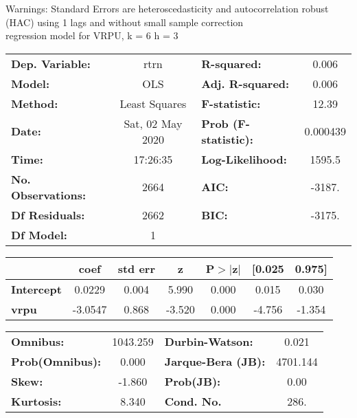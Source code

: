 Warnings: \newline
 [1] Standard Errors are heteroscedasticity and autocorrelation robust (HAC) using 1 lags and without small sample correction\\ 

regression model for VRPU, k = 6 h = 3\begin{center}
\begin{tabular}{lclc}
\toprule
\textbf{Dep. Variable:}    &       rtrn       & \textbf{  R-squared:         } &     0.006   \\
\textbf{Model:}            &       OLS        & \textbf{  Adj. R-squared:    } &     0.006   \\
\textbf{Method:}           &  Least Squares   & \textbf{  F-statistic:       } &     12.39   \\
\textbf{Date:}             & Sat, 02 May 2020 & \textbf{  Prob (F-statistic):} &  0.000439   \\
\textbf{Time:}             &     17:26:35     & \textbf{  Log-Likelihood:    } &    1595.5   \\
\textbf{No. Observations:} &        2664      & \textbf{  AIC:               } &    -3187.   \\
\textbf{Df Residuals:}     &        2662      & \textbf{  BIC:               } &    -3175.   \\
\textbf{Df Model:}         &           1      & \textbf{                     } &             \\
\bottomrule
\end{tabular}
\begin{tabular}{lcccccc}
                   & \textbf{coef} & \textbf{std err} & \textbf{z} & \textbf{P$> |$z$|$} & \textbf{[0.025} & \textbf{0.975]}  \\
\midrule
\textbf{Intercept} &       0.0229  &        0.004     &     5.990  &         0.000        &        0.015    &        0.030     \\
\textbf{vrpu}      &      -3.0547  &        0.868     &    -3.520  &         0.000        &       -4.756    &       -1.354     \\
\bottomrule
\end{tabular}
\begin{tabular}{lclc}
\textbf{Omnibus:}       & 1043.259 & \textbf{  Durbin-Watson:     } &    0.021  \\
\textbf{Prob(Omnibus):} &   0.000  & \textbf{  Jarque-Bera (JB):  } & 4701.144  \\
\textbf{Skew:}          &  -1.860  & \textbf{  Prob(JB):          } &     0.00  \\
\textbf{Kurtosis:}      &   8.340  & \textbf{  Cond. No.          } &     286.  \\
\bottomrule
\end{tabular}
\end{center}

